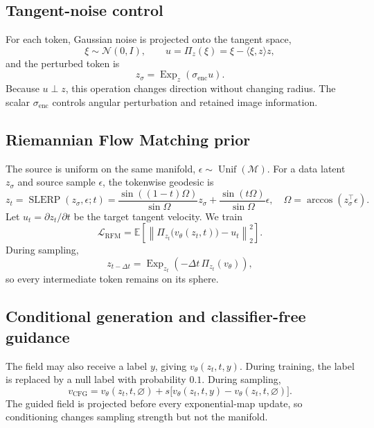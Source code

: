 \documentclass{article}
\begin{document}
\subsection{Tangent-noise control}
For each token, Gaussian noise is projected onto the tangent space,
\begin{equation}
 \xi\sim\mathcal N(0,I),\qquad
 u=\Pi_z(\xi)=\xi-\langle\xi,z\rangle z,
\end{equation}
and the perturbed token is
\begin{equation}
 z_\sigma=\operatorname{Exp}_z(\sigma_{\mathrm{enc}}u).
\label{eq:noise}
\end{equation}
Because $u\perp z$, this operation changes direction without changing radius. The scalar $\sigma_{\mathrm{enc}}$ controls angular perturbation and retained image information.

\subsection{Riemannian Flow Matching prior}
The source is uniform on the same manifold, $\epsilon\sim\operatorname{Unif}(\mathcal M)$. For a data latent $z_\sigma$ and source sample $\epsilon$, the tokenwise geodesic is
\begin{equation}
 z_t=\operatorname{SLERP}(z_\sigma,\epsilon;t)
 =\frac{\sin((1-t)\Omega)}{\sin\Omega}z_\sigma
 +\frac{\sin(t\Omega)}{\sin\Omega}\epsilon,
\quad \Omega=\arccos(z_\sigma^\top\epsilon).
\label{eq:slerp}
\end{equation}
Let $u_t=\partial z_t/\partial t$ be the target tangent velocity. We train
\begin{equation}
 \mathcal L_{\mathrm{RFM}}
 =\mathbb E\!\left[\left\|\Pi_{z_t}\big(v_\theta(z_t,t)\big)-u_t\right\|_2^2\right].
\label{eq:rfm}
\end{equation}
During sampling,
\begin{equation}
 z_{t-\Delta t}=\operatorname{Exp}_{z_t}\!\left(-\Delta t\,\Pi_{z_t}(v_\theta)\right),
\label{eq:sample}
\end{equation}
so every intermediate token remains on its sphere.

\subsection{Conditional generation and classifier-free guidance}
The field may also receive a label $y$, giving $v_\theta(z_t,t,y)$. During training, the label is replaced by a null label with probability $0.1$. During sampling,
\begin{equation}
 v_{\mathrm{CFG}}=v_\theta(z_t,t,\varnothing)
+s\big[v_\theta(z_t,t,y)-v_\theta(z_t,t,\varnothing)\big].
\label{eq:cfg}
\end{equation}
The guided field is projected before every exponential-map update, so conditioning changes sampling strength but not the manifold.
\end{document}
